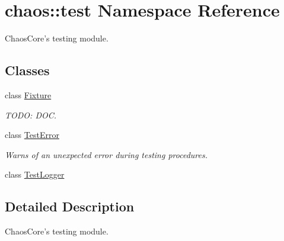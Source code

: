\hypertarget{namespacechaos_1_1test}{\section{chaos\-:\-:test Namespace Reference}
\label{namespacechaos_1_1test}
}


Chaos\-Core's testing module.  


\subsection*{Classes}
\begin{DoxyCompactItemize}
\item 
class \hyperlink{classchaos_1_1test_1_1_fixture}{Fixture}
\begin{DoxyCompactList}\small\item\em T\-O\-D\-O\-: D\-O\-C. \end{DoxyCompactList}\item 
class \hyperlink{classchaos_1_1test_1_1_test_error}{Test\-Error}
\begin{DoxyCompactList}\small\item\em Warns of an unexpected error during testing procedures. \end{DoxyCompactList}\item 
class \hyperlink{classchaos_1_1test_1_1_test_logger}{Test\-Logger}
\end{DoxyCompactItemize}


\subsection{Detailed Description}
Chaos\-Core's testing module. 